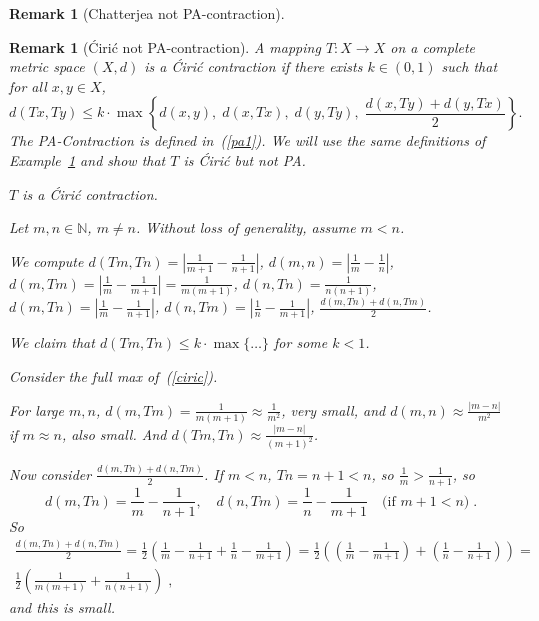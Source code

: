 \documentclass[11pt]{article}
\newtheorem{remark}[theorem]{Remark}
\begin{document}
\begin{remark}[Chatterjea not PA-contraction]
 
\label{rem:chatterjeanotpa}
\end{remark}

\begin{remark}[\'Ciri\'c not PA-contraction]
A mapping $ T: X \to X $ on a complete metric space $ (X,d) $ is a \'Ciri\'c contraction if there exists $ k \in (0,1) $ such that for all $ x, y \in X $,
\begin{equation}
d(Tx, Ty) \leq k \cdot \max\left\{
d(x,y),\;
d(x,Tx),\;
d(y,Ty),\;
\frac{d(x,Ty) + d(y,Tx)}{2}
\right\}.
\label{ciric}
\end{equation}
The PA-Contraction is defined in~(\ref{pa1}). We will use the same definitions of Example~\ref{rem:chatterjeanotpa} and show that $T$ is \'Ciri\'c but not PA.

$ T $  is a \'Ciri\'c contraction.

Let $ m, n \in \mathbb{N} $, $ m \ne n $. Without loss of generality, assume $ m < n $.

We compute
$ d(Tm, Tn) = \left| \frac{1}{m+1} - \frac{1}{n+1} \right| $,
$ d(m,n) = \left| \frac{1}{m} - \frac{1}{n} \right| $,
$ d(m, Tm) = \left| \frac{1}{m} - \frac{1}{m+1} \right| = \frac{1}{m(m+1)} $,
$ d(n, Tn) = \frac{1}{n(n+1)} $,
$ d(m, Tn) = \left| \frac{1}{m} - \frac{1}{n+1} \right| $,
$ d(n, Tm) = \left| \frac{1}{n} - \frac{1}{m+1} \right| $,
$ \frac{d(m,Tn) + d(n,Tm)}{2} $.

We claim that $ d(Tm, Tn) \leq k \cdot \max\{ \dots \} $ for some $ k < 1 $.


Consider the full max of~(\ref{ciric}).

For large $ m, n $, $ d(m,Tm) = \frac{1}{m(m+1)} \approx \frac{1}{m^2} $, very small,
and $ d(m,n) \approx \frac{|m-n|}{m^2} $ if $ m \approx n $, also small.
And $ d(Tm, Tn) \approx \frac{|m-n|}{(m+1)^2} $.

Now consider $ \frac{d(m,Tn) + d(n,Tm)}{2} $. If $ m < n $, $ Tn = n+1 < n $, so $ \frac{1}{m} > \frac{1}{n+1} $, so
\begin{equation}
d(m,Tn) = \frac{1}{m} - \frac{1}{n+1}, \quad
d(n,Tm) = \frac{1}{n} - \frac{1}{m+1} \quad \text{(if } m+1 < n\text{)} \; .
\end{equation}
So
\begin{gather}
\frac{d(m,Tn) + d(n,Tm)}{2} = \frac{1}{2} \left( \frac{1}{m} - \frac{1}{n+1} + \frac{1}{n} - \frac{1}{m+1} \right) 
= \frac{1}{2} \left( \left( \frac{1}{m} - \frac{1}{m+1} \right) + \left( \frac{1}{n} - \frac{1}{n+1} \right) \right) = \nonumber \\
 \frac{1}{2} \left( \frac{1}{m(m+1)} + \frac{1}{n(n+1)} \right) \; ,
\end{gather}
and this is small.


\end{remark}
\end{document}
